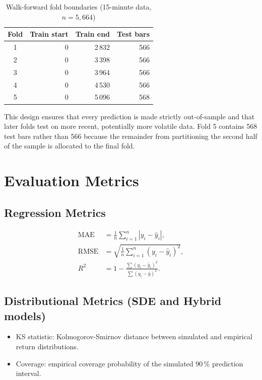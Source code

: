 \documentclass[12pt, a4paper, oneside]{report}
\theoremstyle{plain}
\theoremstyle{definition}
\theoremstyle{remark}
\begin{document}
\begin{table}[H]
\begin{singlespace}
\fontsize{10}{11}\selectfont
\caption{Walk-forward fold boundaries (15-minute data, $n = 5{,}664$)}
\label{tab:wf_splits}
\begin{tabular}{@{}crrr@{}}
\toprule
Fold & Train start & Train end & Test bars \\
\midrule
1 & 0    & 2\,832 & 566 \\
2 & 0    & 3\,398 & 566 \\
3 & 0    & 3\,964 & 566 \\
4 & 0    & 4\,530 & 566 \\
5 & 0    & 5\,096 & 568 \\
\bottomrule
\end{tabular}
\end{singlespace}
\end{table}

This design ensures that every prediction is made strictly out-of-sample and
that later folds test on more recent, potentially more volatile data.  Fold 5
contains 568 test bars rather than 566 because the remainder from partitioning
the second half of the sample is allocated to the final fold.

\section{Evaluation Metrics}

\subsection{Regression Metrics}

\begin{align}
  \text{MAE} &= \tfrac{1}{n}\textstyle\sum_{i=1}^n |y_i - \hat y_i|, \\
  \text{RMSE} &= \sqrt{\tfrac{1}{n}\textstyle\sum_{i=1}^n (y_i - \hat y_i)^2}, \\
  R^2 &= 1 - \tfrac{\textstyle\sum (y_i - \hat y_i)^2}{\textstyle\sum (y_i - \bar y)^2}.
\end{align}

\subsection{Distributional Metrics (SDE and Hybrid models)}

\begin{itemize}[leftmargin=1.25cm]
  \item KS statistic: Kolmogorov-Smirnov distance between simulated and
    empirical return distributions.
  \item Coverage: empirical coverage probability of the simulated 90\,\%
    prediction interval.
\end{itemize}
\end{document}
